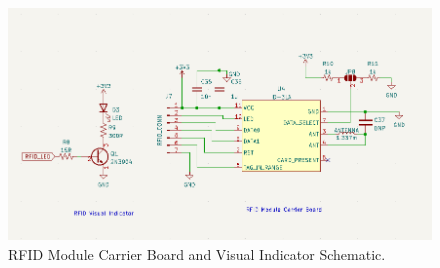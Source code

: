 \documentclass{article}
\begin{document}
\begin{center}
	\begin{figure}[H]
		\centering
		\includegraphics[width= \textwidth]{rfid_sch.png}
		\caption{RFID Module Carrier Board and Visual Indicator Schematic.} \label{rfid_sch}
	\end{figure}
\end{center}


\paragraph{} 
\end{document}

